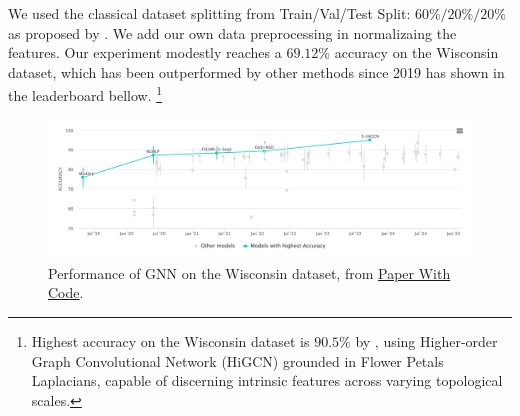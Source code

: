 \documentclass{article}
\theoremstyle{plain}
\theoremstyle{definition}
\theoremstyle{remark}
\begin{document}
We used the classical dataset splitting from Train/Val/Test Split: $60\%/20\%/20\%$ 
as proposed by \cite{attali2024delaunay}. We add our own data preprocessing in normalizaing the features.
Our experiment modestly reaches a $69.12\%$ accuracy on the Wisconsin dataset,
which has been outperformed by other methods since 2019 has shown in the leaderboard bellow.
\footnote{Highest accuracy on the Wisconsin dataset is $90.5\%$ by \cite{huang2024higherordergraphconvolutionalnetwork}, using
Higher-order Graph Convolutional Network (HiGCN) grounded in Flower Petals Laplacians, 
capable of discerning intrinsic features across varying topological scales. }

\begin{figure}[htb!]
    \includegraphics[width=\textwidth]{figures/Wisconsin_leaderboard.png}
    \caption{Performance of GNN on the Wisconsin dataset, from \href{https://paperswithcode.com/sota/node-classification-on-wisconsin}{Paper With Code}.}
    \label{fig:wisconsin_leaderboard}
\end{figure}
\end{document}
